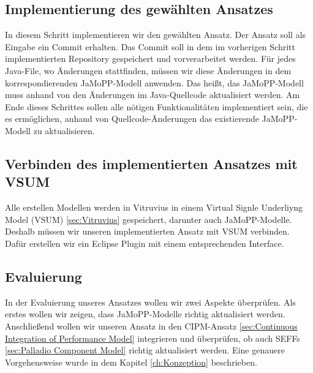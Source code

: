 \subsection{Implementierung des gewählten Ansatzes}
In diesem Schritt implementieren wir den gewählten Ansatz. Der Ansatz soll als Eingabe ein Commit erhalten. Das Commit soll in dem im vorherigen Schritt implementierten Repository gespeichert und vorverarbeitet werden. Für jedes Java-File, wo Änderungen stattfinden, müssen wir diese Änderungen in dem korrespondierenden JaMoPP-Modell anwenden. Das heißt, das JaMoPP-Modell muss anhand von den Änderungen im Java-Quellcode aktualisiert werden. Am Ende dieses Schrittes sollen alle nötigen Funktionalitäten implementiert sein, die es ermöglichen, anhand von Quellcode-Änderungen das existierende JaMoPP-Modell zu aktualisieren.

\subsection{Verbinden des implementierten Ansatzes mit VSUM}
Alle erstellen Modellen werden in Vitruvius in einem Virtual Signle Underliyng Model (VSUM) \ref{sec:Vitruvius} gespeichert, darunter auch JaMoPP-Modelle. Deshalb müssen wir unseren implementierten Ansatz mit VSUM verbinden. Dafür erstellen wir ein Eclipse Plugin mit einem entsprechenden Interface.  

\subsection{Evaluierung}
In der Evaluierung unseres Ansatzes wollen wir zwei Aspekte überprüfen. Als erstes wollen wir zeigen, dass JaMoPP-Modelle richtig aktualisiert werden. Anschließend wollen wir unseren Ansatz in den CIPM-Ansatz \ref{sec:Continuous Integration of Performance Model} integrieren und überprüfen, ob auch SEFFs \ref{sec:Palladio Component Model} richtig aktualisiert werden. Eine genauere Vorgehensweise wurde in dem Kapitel \ref{ch:Konzeption} beschrieben.


